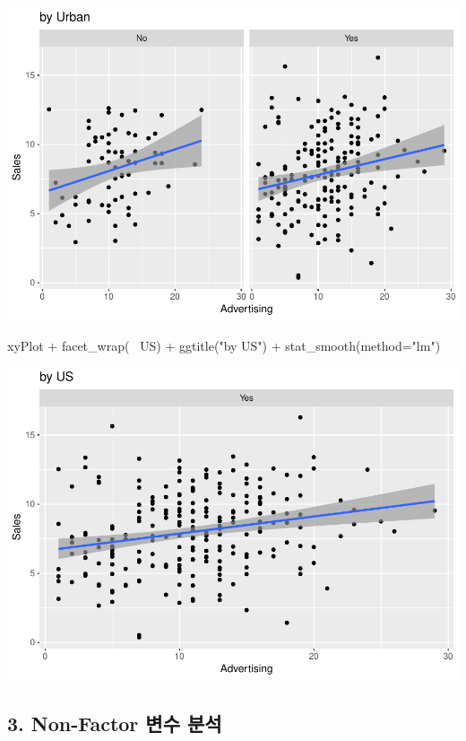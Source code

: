\documentclass[a4paper]{article}
\newenvironment{Shaded}{}{}
\newcommand{\KeywordTok}[1]{\textcolor[rgb]{0.00,0.00,1.00}{#1}}
\newcommand{\DataTypeTok}[1]{#1}
\newcommand{\StringTok}[1]{\textcolor[rgb]{0.00,0.50,0.50}{#1}}
\newcommand{\OperatorTok}[1]{#1}
\newcommand{\NormalTok}[1]{#1}
\begin{document}
\includegraphics{class3_rmd_pdf_files/figure-latex/unnamed-chunk-5-1.pdf}

\begin{Shaded}
\begin{Highlighting}[]
\NormalTok{xyPlot }\OperatorTok{+}\StringTok{ }\KeywordTok{facet_wrap}\NormalTok{(}\OperatorTok{~}\StringTok{ }\NormalTok{US) }\OperatorTok{+}\StringTok{ }\KeywordTok{ggtitle}\NormalTok{(}\StringTok{"by US"}\NormalTok{) }\OperatorTok{+}\StringTok{ }\KeywordTok{stat_smooth}\NormalTok{(}\DataTypeTok{method=}\StringTok{"lm"}\NormalTok{)}
\end{Highlighting}
\end{Shaded}

\includegraphics{class3_rmd_pdf_files/figure-latex/unnamed-chunk-5-2.pdf}

\subsection{3. Non-Factor 변수 분석}\label{non-factor--}
\end{document}
